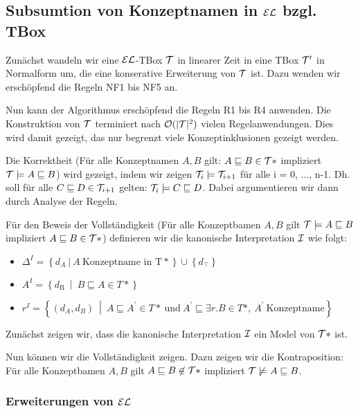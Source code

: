 \subsection{Subsumtion von Konzeptnamen in $\mathcal{E}\mathcal{L}$ bzgl. TBox}

Zunächst wandeln wir eine $\mathcal{E}\mathcal{L}$-TBox $\mathcal{T}$ in linearer Zeit in eine TBox $\mathcal{T}'$ in Normalform um, die eine konserative Erweiterung von $\mathcal{T}$ ist. Dazu wenden wir erschöpfend die Regeln NF1 bis NF5 an.

Nun kann der Algorithmus erschöpfend die Regeln R1 bis R4 anwenden. Die Konstruktion von $\mathcal{T}$ terminiert nach $\mathcal{O}(|\mathcal{T}|^2)$ vielen Regelanwendungen. Dies wird damit gezeigt, das nur begrenzt viele Konzeptinklusionen gezeigt werden.

Die Korrektheit (Für alle Konzeptnamen $A,B$ gilt: $A \sqsubseteq B \in \mathcal{T}*$ impliziert $\mathcal{T} \models A \sqsubseteq B$) wird gezeigt, indem wir zeigen $\mathcal{T}_i \models \mathcal{T}_{i+1}$ für alle i = 0, ..., n-1. Dh. soll für alle $C \sqsubseteq D \in \mathcal{T}_{i+1}$ gelten: $\mathcal{T}_i \models C \sqsubseteq D$. Dabei argumentieren wir dann durch Analyse der Regeln. 

Für den Beweis der Vollständigkeit (Für alle Konzeptbamen $A,B$ gilt $\mathcal{T} \models A \sqsubseteq B$ impliziert $A \sqsubseteq B \in \mathcal{T} *$) definieren wir die kanonische Interpretation $\mathcal{I}$ wie folgt:

\begin{itemize}
\item
  $\Delta^{I} = \left\{ d_{A}\ |\ A\ \mathrm{\text{Konzeptname\ in\ T}}* \right\} \cup \left\{ d_{\top} \right\}$
\item
  $A^{I} = \left\{ d_{\text{B\ }} \middle| \ B \sqsubseteq A \in T* \right\}$
\item
  $r^{I} = \left\{ \left( d_{A},d_{B} \right)\  \middle| \ A \sqsubseteq A^{'} \in T*\ \mathrm{\text{und}}\ A^{'} \sqsubseteq \exists r.B \in T*,\ A^{'}\ \mathrm{\text{Konzeptname}} \right\}$
\end{itemize}

Zunächst zeigen wir, dass die kanonische Interpretation $\mathcal{I}$ ein Model von $\mathcal{T} *$ ist.

Nun können wir die Vollständigkeit zeigen. Dazu zeigen wir die Kontraposition: Für alle Konzeptbamen $A,B$ gilt $A \sqsubseteq B \not\in \mathcal{T} *$ impliziert $\mathcal{T} \not\models A \sqsubseteq B$.

\subsubsection{Erweiterungen von $\mathcal{E}\mathcal{L}$}

